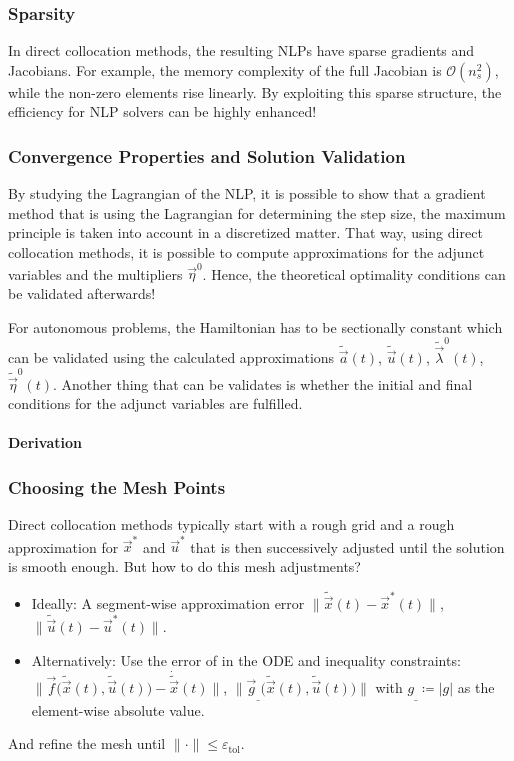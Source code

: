			\subsubsection{Sparsity}
				In direct collocation methods, the resulting NLPs have sparse gradients and Jacobians. For example, the memory complexity of the full Jacobian is \( \mathcal{O}(n_s^2) \), while the non-zero elements rise linearly. By exploiting this sparse structure, the efficiency for NLP solvers can be highly enhanced!

			\subsubsection{Convergence Properties and Solution Validation}
				By studying the Lagrangian of the NLP, it is possible to show that a gradient method that is using the Lagrangian for determining the step size, the maximum principle is taken into account in a discretized matter. That way, using direct collocation methods, it is possible to compute approximations for the adjunct variables and the multipliers \(\vec{\eta}^0\). Hence, the theoretical optimality conditions can be validated afterwards!

				For autonomous problems, the Hamiltonian has to be sectionally constant which can be validated using the calculated approximations \( \tilde{\vec{a}}(t) \), \( \tilde{\vec{u}}(t) \), \( \tilde{\vec{\lambda}}^0(t) \), \( \tilde{\vec{\eta}}^0(t) \). Another thing that can be validates is whether the initial and final conditions for the adjunct variables are fulfilled.

				\paragraph{Derivation} %

			\subsubsection{Choosing the Mesh Points}
				Direct collocation methods typically start with a rough grid and a rough approximation for \(\vec{x}^\ast\) and \(\vec{u}^\ast\) that is then successively adjusted until the solution is smooth enough. But how to do this mesh adjustments?
				\begin{itemize}
					\item Ideally: A segment-wise approximation error \( \big\lVert \tilde{\vec{x}}(t) - \vec{x}^\ast(t) \big\rVert \), \( \big\lVert \tilde{\vec{u}}(t) - \vec{u}^\ast(t) \big\rVert \).
					\item Alternatively: Use the error of in the ODE and inequality constraints: \( \big\lVert \vec{f}\big(\tilde{\vec{x}}(t), \tilde{\vec{u}}(t)\big) - \dot{\tilde{\vec{x}}}(t) \big\rVert \), \( \big\lVert \vec{g}_{\_}\big(\tilde{\vec{x}}(t), \tilde{\vec{u}}(t)\big) \big\rVert \) with \( g_{\_} \coloneqq \lvert g \rvert \) as the element-wise absolute value.
				\end{itemize}
				And refine the mesh until \( \lVert \cdot \rVert \leq \varepsilon_\mathrm{tol} \).

